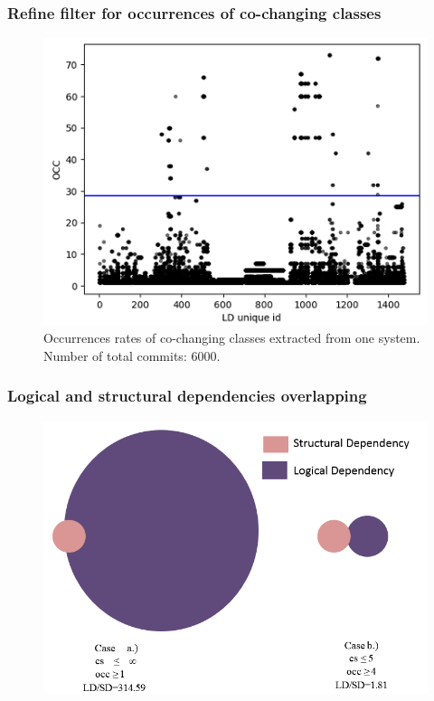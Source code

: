 \documentclass{beamer}
\begin{document}

 \begin{frame}
\frametitle{Refine filter for occurrences of co-changing classes}

\begin{center}
     \begin{figure}
	\includegraphics[width= 8.0 cm]{filter_occ.PNG}
	\caption{\label{fig:fig4} Occurrences rates of co-changing classes extracted from one system. Number of total commits: 6000. }
     \end{figure}
\end{center}

\end{frame}



 \begin{frame}
\frametitle{Logical and structural dependencies overlapping}
\vskip 0.2cm
\begin{center}
     \begin{figure}
	\includegraphics[width=\textwidth]{sd_vs_ld.PNG}
     \end{figure}
\end{center}
\end{frame}
\end{document}
